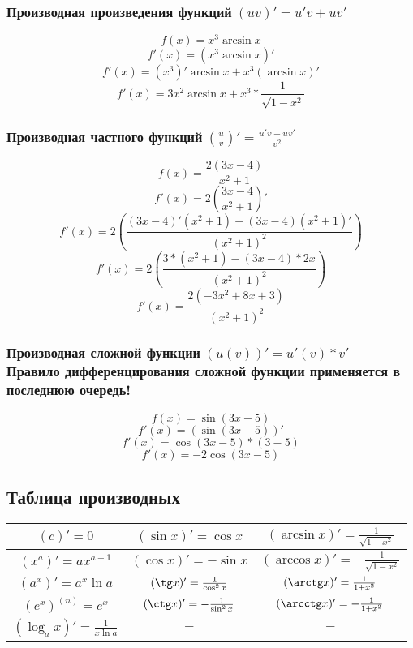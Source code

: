\documentclass[12pt,a4paper]{article}
\begin{document}
\subsubsection{Производная произведения функций$\;(uv)'=u'v+uv'$}
$$f(x)=x^3\arcsin{x}$$
$$f'(x)=(x^3\arcsin{x})'$$
$$f'(x)=(x^3)'\arcsin{x}+x^3(\arcsin{x})'$$
$$f'(x)=3x^2\arcsin{x}+x^3*\frac{1}{\sqrt{1-x^2}}$$
\subsubsection{Производная частного функций$\;(\frac{u}{v})'=\frac{u'v-uv'}{v^2}$}
$$f(x)=\frac{2(3x-4)}{x^2+1}$$
$$f'(x)=2(\frac{3x-4}{x^2+1})'$$
$$f'(x)=2(\frac{(3x-4)'(x^2+1) - (3x-4)(x^2+1)'}{(x^2+1)^2})$$
$$f'(x)=2(\frac{3*(x^2+1)-(3x-4)*2x}{(x^2+1)^2})$$
$$f'(x)=\frac{2(-3x^2+8x+3)}{(x^2+1)^2}$$
\subsubsection{Производная сложной функции$\;(u(v))'=u'(v)*v'$\\Правило дифференцирования сложной функции применяется в последнюю очередь!}
$$f(x)=\sin{(3x-5)}$$
$$f'(x)=(\sin{(3x-5)})'$$
$$f'(x)=\cos{(3x-5)}*(3-5)$$
$$f'(x)=-2\cos{(3x-5)}$$

\subsection{Таблица производных}

\begin{center}
\begin{tabular}{|c|c|c|}
\hline
$(c)'=0$ & $(\sin x)'=\cos x$ & $(\arcsin x)'=\frac{1}{\sqrt{1-x^2}}$ \\
\hline
$(x^a)'=ax^{a-1}$ & $(\cos x)'=-\sin x$ & $(\arccos x)'=-\frac{1}{\sqrt{1-x^2}}$ \\
\hline
$(a^x)'=a^x\ln a$ & $(\tg x)'=\frac{1}{\cos^2 x}$ & $(\arctg x)'=\frac{1}{1+x^2}$ \\
\hline
$(e^x)^{(n)}=e^x$ & $(\ctg x)'=-\frac{1}{\sin^2 x}$ & $(\arcctg x)'=-\frac{1}{1+x^2}$ \\
\hline
$(\log_{a} x)'=\frac{1}{x\ln a}$ & $-$ & $-$ \\
\hline
\end{tabular}
\end{center}
\end{document}
